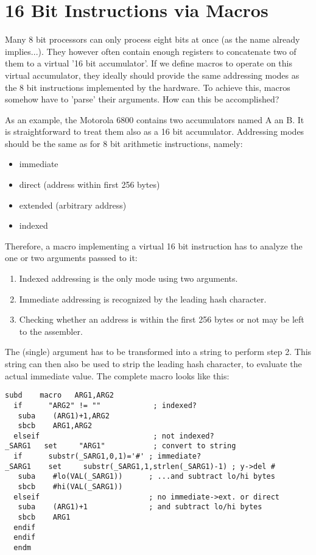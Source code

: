 \documentclass[12pt,twoside]{report}
\begin{document}
\section{16 Bit Instructions via Macros}

Many 8 bit processors can only process eight bits at once (as the name already
implies...).  They however often contain enough registers to concatenate
two of them to a virtual '16 bit accumulator'.  If we define macros to operate
on this virtual accumulator, they ideally should provide the same addressing
modes as the 8 bit instructions implemented by the hardware.  To achieve this,
macros somehow have to 'parse' their arguments.  How can this be accomplished?

As an example, the Motorola 6800 contains two accumulators named A an B.  It
is straightforward to treat them also as a 16 bit accumulator.  Addressing modes
should be the same as for 8 bit arithmetic instructions, namely:
\begin{itemize}
\item{immediate}
\item{direct (address within first 256 bytes)}
\item{extended (arbitrary address)}
\item{indexed}
\end{itemize}
Therefore, a macro implementing a virtual 16 bit instruction has to analyze
the one or two arguments passsed to it:
\begin{enumerate}
\item{Indexed addressing is the only mode using two arguments.}
\item{Immediate addressing is recognized by the leading hash character.}
\item{Checking whether an address is within the first 256 bytes or not
      may be left to the assembler.}
\end{enumerate}
The (single) argument has to be transformed into a string to perform step 2.
This string can then also be used to strip the leading hash character, to evaluate
the actual immediate value.  The complete macro looks like this:
\begin{verbatim}
subd    macro   ARG1,ARG2
  if      "ARG2" != ""            ; indexed?
   suba    (ARG1)+1,ARG2
   sbcb    ARG1,ARG2
  elseif                          ; not indexed?
_SARG1   set     "ARG1"           ; convert to string
  if      substr(_SARG1,0,1)='#' ; immediate?
_SARG1    set     substr(_SARG1,1,strlen(_SARG1)-1) ; y->del #
   suba    #lo(VAL(_SARG1))      ; ...and subtract lo/hi bytes
   sbcb    #hi(VAL(_SARG1))
  elseif                         ; no immediate->ext. or direct
   suba    (ARG1)+1              ; and subtract lo/hi bytes
   sbcb    ARG1
  endif
  endif
  endm
\end{verbatim}
\end{document}
